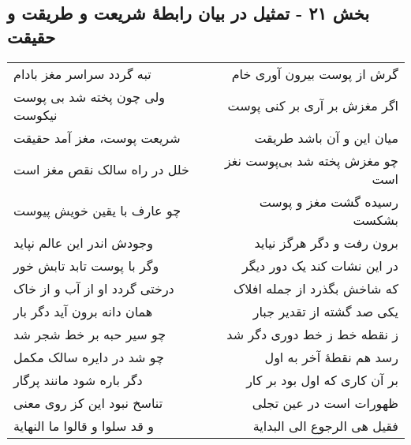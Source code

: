 \begin{center}
\section*{بخش ۲۱ - تمثیل در بیان رابطهٔ شریعت و طریقت و حقیقت}
\label{sec:sh021}
\begin{longtable}{l p{0.5cm} r}
تبه گردد سراسر مغز بادام
&&
گرش از پوست بیرون آوری خام
\\
ولی چون پخته شد بی پوست نیکوست
&&
اگر مغزش بر آری بر کنی پوست
\\
شریعت پوست، مغز آمد حقیقت
&&
میان این و آن باشد طریقت
\\
خلل در راه سالک نقص مغز است
&&
چو مغزش پخته شد بی‌پوست نغز است
\\
چو عارف با یقین خویش پیوست
&&
رسیده گشت مغز و پوست بشکست
\\
وجودش اندر این عالم نپاید
&&
برون رفت و دگر هرگز نیاید
\\
وگر با پوست تابد تابش خور
&&
در این نشات کند یک دور دیگر
\\
درختی گردد او از آب و از خاک
&&
که شاخش بگذرد از جمله افلاک
\\
همان دانه برون آید دگر بار
&&
یکی صد گشته از تقدیر جبار
\\
چو سیر حبه بر خط شجر شد
&&
ز نقطه خط ز خط دوری دگر شد
\\
چو شد در دایره سالک مکمل
&&
رسد هم نقطهٔ آخر به اول
\\
دگر باره شود مانند پرگار
&&
بر آن کاری که اول بود بر کار
\\
تناسخ نبود این کز روی معنی
&&
ظهورات است در عین تجلی
\\
و قد سلوا و قالوا ما النهایة
&&
فقیل هی الرجوع الی البدایة
\\
\end{longtable}
\end{center}
